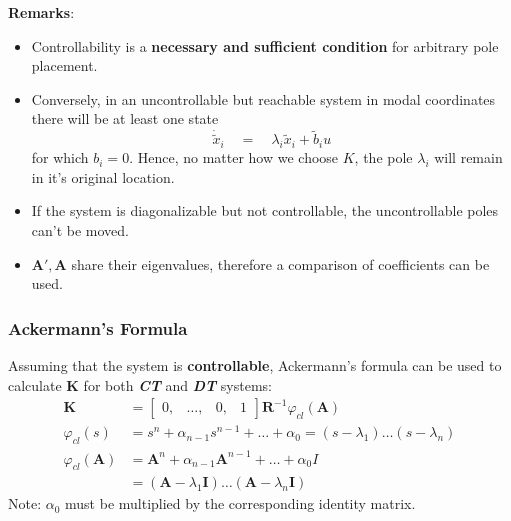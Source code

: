 \textbf{Remarks}:
\begin{itemize}
    \item Controllability is a \textbf{necessary and sufficient condition} for arbitrary pole placement.
    \item Conversely, in an uncontrollable but reachable system in modal coordinates there will be at least one state
          \begin{equation*}
              \dot{\tilde{x}}_i\quad=\quad\lambda_i\tilde{x}_i+\tilde{b}_i u
          \end{equation*}
          for which $b_i=0$. Hence, no matter how we choose $K$, the pole $\lambda_i$ will remain in it's original location.
    \item If the system is diagonalizable but not controllable, the uncontrollable poles can't be moved.
    \item $\mathbf{A'},\mathbf{A}$ share their eigenvalues, therefore a comparison of coefficients can be used.
\end{itemize}

\subsubsection{Ackermann's Formula}
Assuming that the system is \textbf{controllable}, Ackermann's formula can be used to calculate $\mathbf{K}$ for both \textbf{\textit{CT}} and \textbf{\textit{DT}} systems:
\noindent\begin{align*}
    \mathbf{K}               & =\begin{bmatrix}
                                    0, & \ldots, & 0, & 1
                                \end{bmatrix}
    \mathbf{R}^{-1}\varphi_{cl}(\mathbf{A})                                                               \\
    \varphi_{cl}(s)          & =s^n+\alpha_{n-1}s^{n-1}+\ldots+\alpha_0=(s-\lambda_1)\ldots(s-\lambda_n)  \\
    \varphi_{cl}(\mathbf{A}) & =\mathbf{A}^n+\alpha_{n-1}\mathbf{A}^{n-1}+\ldots+\alpha_0 I               \\
                             & = (\mathbf{A}-\lambda_1 \mathbf{I})\ldots(\mathbf{A}-\lambda_n \mathbf{I})
\end{align*}
Note: $\alpha_0$ must be multiplied by the corresponding identity matrix.

